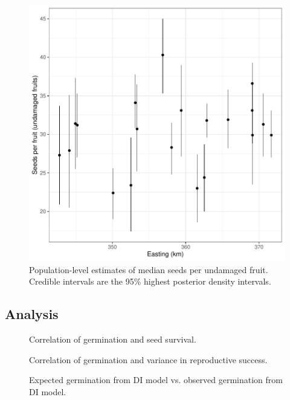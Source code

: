 \documentclass[12pt, oneside]{article}   	%
\begin{document}
 \begin{figure}[!h]
   \centering
       \includegraphics[page=1,width=\textwidth]{../../figures/spatialSeeds.pdf}  
    \caption{ Population-level estimates of median seeds per undamaged fruit. Credible intervals are the 95\% highest posterior density intervals. }
\end{figure}

\clearpage
\newpage
\subsection*{Analysis}

 \begin{figure}[!h]
   \centering
    \caption{ Correlation of germination and seed survival. }
 \label{fig:viability-estimates-population}
\end{figure}

 \begin{figure}[!h]
   \centering
    \caption{ Correlation of germination and variance in reproductive success. }
 \label{fig:viability-estimates-population}
\end{figure}

 \begin{figure}[!h]
   \centering
    \caption{ Expected germination from DI model vs. observed germination from DI model. }
 \label{fig:viability-estimates-population}
\end{figure}
\end{document}
